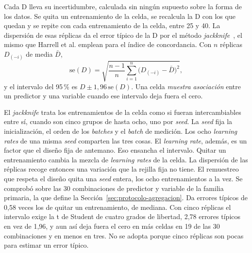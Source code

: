 Cada D lleva su incertidumbre, calculada sin ningún supuesto sobre la forma de los datos. Se quita un entrenamiento de la celda, se recalcula la D con los que quedan y se repite con cada entrenamiento de la celda, entre 25 y 40. La dispersión de esas réplicas da el error típico de la D por el método \emph{jackknife}~\cite{efron1982jackknife}, el mismo que Harrell et al. emplean para el índice de concordancia. Con $n$ réplicas $D_{(-i)}$ de media $\bar{D}$,
\begin{equation}
\mathrm{se}(D) = \sqrt{\frac{n-1}{n}\sum_{i=1}^{n}\bigl(D_{(-i)} - \bar{D}\bigr)^2},
\label{eq:jackknife}
\end{equation}
y el intervalo del 95\,\% es $D \pm 1{,}96\,\mathrm{se}(D)$. Una celda \emph{muestra asociación} entre un predictor y una variable cuando ese intervalo deja fuera el cero.

El \emph{jackknife} trata los entrenamientos de la celda como si fueran intercambiables entre sí, cuando son cinco grupos de hasta ocho, uno por \emph{seed}. La \emph{seed} fija la inicialización, el orden de los \emph{batches} y el \emph{batch} de medición. Los ocho \emph{learning rates} de una misma \emph{seed} comparten las tres cosas. El \emph{learning rate}, además, es un factor que el diseño fija de antemano. Eso ensancha el intervalo. Quitar un entrenamiento cambia la mezcla de \emph{learning rates} de la celda. La dispersión de las réplicas recoge entonces una variación que la rejilla fija no tiene. El remuestreo que respeta el diseño quita una \emph{seed} entera, los ocho entrenamientos a la vez. Se comprobó sobre las 30 combinaciones de predictor y variable de la familia primaria, la que define la Sección~\ref{sec:protocolo-agregacion}. Da errores típicos de 0,58 veces los de quitar un entrenamiento, de mediana. Con cinco réplicas el intervalo exige la t de Student de cuatro grados de libertad, 2,78 errores típicos en vez de 1,96, y aun así deja fuera el cero en más celdas en 19 de las 30 combinaciones y en menos en tres. No se adopta porque cinco réplicas son pocas para estimar un error típico.

